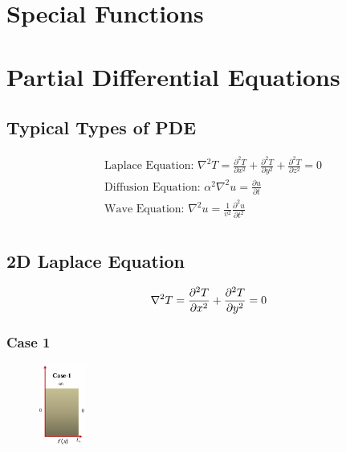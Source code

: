 \documentclass[10pt]{article}
\begin{document}
\newpage

\section{Special Functions}




















\newpage

\section{Partial Differential Equations}
\subsection*{Typical Types of PDE}
\[
\begin{aligned}
	&\text{Laplace Equation: } \nabla^2 T = \frac{\partial^2 T}{\partial x^2} + \frac{\partial^2 T}{\partial y^2} + \frac{\partial^2 T}{\partial z^2} = 0\\
	&\text{Diffusion Equation: } \alpha^2 \nabla^2 u = \frac{\partial u}{\partial t}\\
	&\text{Wave Equation: } \nabla^2 u = \frac{1}{v^2} \frac{\partial^2 u}{\partial t^2}\\
\end{aligned}
\]

\subsection{2D Laplace Equation}
\[
\nabla^2 T = \frac{\partial^2 T}{\partial x^2} + \frac{\partial^2 T}{\partial y^2} = 0\\
\]

\subsubsection*{Case 1}
\begin{figure}
	\centering
	\includegraphics[width=0.14\textwidth]{img5-1}
\end{figure}
\end{document}
